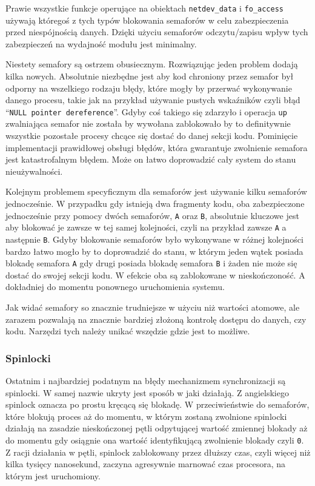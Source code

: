 \documentclass[11pt]{scrartcl}
\begin{document}
Prawie wszystkie funkcje operujące na obiektach \texttt{netdev\_data} i \texttt{fo\_access} używają któregoś z tych typów blokowania semaforów w celu zabezpieczenia przed niespójnością danych. Dzięki użyciu semaforów odczytu/zapisu wpływ tych zabezpieczeń na wydajność modułu jest minimalny.

Niestety semafory są ostrzem obusiecznym. Rozwiązując jeden problem dodają kilka nowych. Absolutnie niezbędne jest aby kod chroniony przez semafor był odporny na wszelkiego rodzaju błędy, które mogły by przerwać wykonywanie danego procesu, takie jak na przykład używanie pustych wskaźników czyli błąd ``\texttt{NULL pointer dereference}''. Gdyby coś takiego się zdarzyło i operacja \texttt{up} zwalniająca semafor nie została by wywołana zablokowało by to definitywnie wszystkie pozostałe procesy chcące się dostać do danej sekcji kodu. Pominięcie implementacji prawidłowej obsługi błędów, która gwarantuje zwolnienie semafora jest katastrofalnym błędem. Może on łatwo doprowadzić cały system do stanu nieużywalności.

Kolejnym problemem specyficznym dla semaforów jest używanie kilku semaforów jednocześnie. W przypadku gdy istnieją dwa fragmenty kodu, oba zabezpieczone jednocześnie przy pomocy dwóch semaforów, \texttt{A} oraz \texttt{B}, absolutnie kluczowe jest aby blokować je zawsze w tej samej kolejności, czyli na przykład zawsze \texttt{A} a następnie \texttt{B}. Gdyby blokowanie semaforów było wykonywane w różnej kolejności bardzo łatwo mogło by to doprowadzić do stanu, w którym jeden wątek posiada blokadę semafora \texttt{A} gdy drugi posiada blokadę semafora \texttt{B} i żaden nie może się dostać do swojej sekcji kodu. W efekcie oba są zablokowane w nieskończoność. A dokładniej do momentu ponownego uruchomienia systemu.

Jak widać semafory so znacznie trudniejsze w użyciu niż wartości atomowe, ale zarazem pozwalają na znacznie bardziej złożoną kontrolę dostępu do danych, czy kodu. Narzędzi tych należy unikać wszędzie gdzie jest to możliwe.

\subsubsection{Spinlocki}

Ostatnim i najbardziej podatnym na błędy mechanizmem synchronizacji są spinlocki. W samej nazwie ukryty jest sposób w jaki działają. Z angielskiego spinlock oznacza po prostu kręcącą się blokadę. W przeciwieństwie do semaforów, które blokują proces aż do momentu, w którym zostaną zwolnione spinlocki działają na zasadzie nieskończonej pętli odpytującej wartość zmiennej blokady aż do momentu gdy osiągnie ona wartość identyfikującą zwolnienie blokady czyli \texttt{0}. Z racji działania w pętli, spinlock zablokowany przez dłuższy czas, czyli więcej niż kilka tysięcy nanosekund, zaczyna agresywnie marnować czas procesora, na którym jest uruchomiony.
\end{document}

